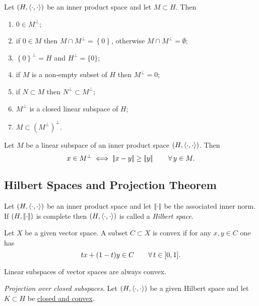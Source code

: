 \documentclass{article}
\begin{document}
\begin{proposition}
	Let $\left(H,\langle \cdot,\cdot \rangle\right)$ be an inner product space and let $M\subset H$. Then
	\begin{enumerate}
		\item $0\in M^{\perp}$;
		\item if $0\in M$ then $M\cap M^{\perp}=\left\{0\right\}$, otherwise $M\cap M^{\perp}=\emptyset$;
		\item $\left\{0\right\}^{\perp}=H$ and $H^{\perp}=\{0\}$;
		\item if $M$ is a non-empty subset of $H$ then $M^{\perp}=0$;
		\item if $N\subset M$ then $N^{\perp}\subset M^{\perp}$;
		\item $M^{\perp}$ is a closed linear subspace of $H$;
		\item $M\subset\left(M^{\perp}\right)^{\perp}$.
	\end{enumerate}
\end{proposition}
\begin{proposition}
	Let $M$ be a linear subspace of an inner product space $\left(H,\langle \cdot,\cdot \rangle\right)$. Then
	\begin{equation*}
		x\in M^{\perp}\iff\left|\negthinspace\left|x-y\right|\negthinspace\right|\geq\left|\negthinspace\left|y\right|\negthinspace\right|\qquad\forall\, y\in M.
	\end{equation*}
\end{proposition}
\subsection{Hilbert Spaces and Projection Theorem}
\begin{definition}
	Let $\left(H,\langle \cdot,\cdot \rangle\right)$ be an inner product space and let $\left|\negthinspace\left|\cdot\right|\negthinspace\right|$ be the associated inner norm. If $(H,\left|\negthinspace\left|\cdot\right|\negthinspace\right|)$ is complete then $\left(H,\langle \cdot,\cdot \rangle\right)$ is called a \emph{Hilbert space}.
\end{definition}
\begin{definition}
	Let $X$ be a given vector space. A subset $C\subset X$ is convex if for any $x,y\in C$ one has
	\begin{equation*}
		tx+(1-t)y\in C\qquad\forall\, t\in[0,1].
	\end{equation*}
\end{definition}
Linear subspaces of vector spaces are always convex.
\begin{theorem}
	\emph{Projection over closed subspaces}. Let $(H,\langle \cdot,\cdot \rangle)$ be a given Hilbert space and let $K\subset H$ be \underline{closed and convex}.
\end{theorem}
%
\end{document}
